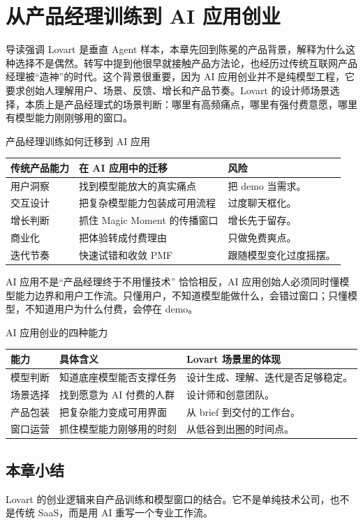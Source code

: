 \section{从产品经理训练到 AI 应用创业}

导读强调 Lovart 是垂直 Agent 样本，本章先回到陈冕的产品背景，解释为什么这种选择不是偶然。转写中提到他很早就接触产品方法论，也经历过传统互联网产品经理被“造神”的时代。这个背景很重要，因为 AI 应用创业并不是纯模型工程，它要求创始人理解用户、场景、反馈、增长和产品节奏。Lovart 的设计师场景选择，本质上是产品经理式的场景判断：哪里有高频痛点，哪里有强付费意愿，哪里有模型能力刚刚够用的窗口。

\begin{knowledgebox}{产品经理训练如何迁移到 AI 应用}
\begin{tabularx}{\textwidth}{p{}p{}X}
\toprule
传统产品能力 & 在 AI 应用中的迁移 & 风险 \\
\midrule
用户洞察 & 找到模型能放大的真实痛点 & 把 demo 当需求。 \\
交互设计 & 把复杂模型能力包装成可用流程 & 过度聊天框化。 \\
增长判断 & 抓住 Magic Moment 的传播窗口 & 增长先于留存。 \\
商业化 & 把体验转成付费理由 & 只做免费爽点。 \\
迭代节奏 & 快速试错和收敛 PMF & 跟随模型变化过度摇摆。 \\
\bottomrule
\end{tabularx}
\end{knowledgebox}

\begin{warningbox}{AI 应用不是“产品经理终于不用懂技术”}
恰恰相反，AI 应用创始人必须同时懂模型能力边界和用户工作流。只懂用户，不知道模型能做什么，会错过窗口；只懂模型，不知道用户为什么付费，会停在 demo。
\end{warningbox}

\begin{knowledgebox}{AI 应用创业的四种能力}
\begin{tabularx}{\textwidth}{p{}p{}X}
\toprule
能力 & 具体含义 & Lovart 场景里的体现 \\
\midrule
模型判断 & 知道底座模型能否支撑任务 & 设计生成、理解、迭代是否足够稳定。 \\
场景选择 & 找到愿意为 AI 付费的人群 & 设计师和创意团队。 \\
产品包装 & 把复杂能力变成可用界面 & 从 brief 到交付的工作台。 \\
窗口运营 & 抓住模型能力刚够用的时刻 & 从低谷到出圈的时间点。 \\
\bottomrule
\end{tabularx}
\end{knowledgebox}

\subsection{本章小结}

Lovart 的创业逻辑来自产品训练和模型窗口的结合。它不是单纯技术公司，也不是传统 SaaS，而是用 AI 重写一个专业工作流。

